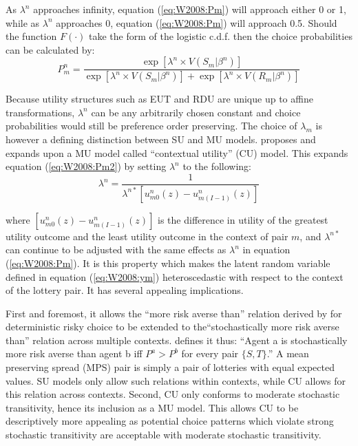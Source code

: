 \documentclass[../main.tex]{subfiles}
\begin{document}
As $\lambda^n$ approaches infinity, equation (\ref{eq:W2008:Pm}) will approach either 0 or 1, while as $\lambda^n$ approaches 0, equation (\ref{eq:W2008:Pm}) will approach 0.5.
Should the function $F(\cdot)$ take the form of the logistic c.d.f. then the choice probabilities can be calculated by:
\begin{equation}
	\label{eq:W2008:Pm2}
	P_m^n = \frac{\exp \left[ \lambda^n \times V(S_m | \beta^n) \right]}{  \exp \left[ \lambda^n \times V(S_m | \beta^n) \right] + \exp \left[ \lambda^n \times V(R_m | \beta^n) \right] }
\end{equation}

Because utility structures such as EUT and RDU are unique up to affine transformations, $\lambda^n$ can be any arbitrarily chosen constant and choice probabilities would still be preference order preserving.
The choice of $\lambda_m$ is however a defining distinction between SU and MU models.
\textcite{Wilcox2008} proposes and \textcite{Wilcox2011} expands upon a MU model called \enquote{contextual utility} (CU) model. This expands equation (\ref{eq:W2008:Pm2}) by setting $\lambda^n$ to the following:
\begin{equation}
	\lambda^n = \frac{1}{\lambda^{n*} \left[ u^n_{m0}(z) - u^n_{m(I-1)}(z) \right]}
\end{equation}

\noindent where $\left[ u^n_{m0}(z) - u^n_{m(I-1)}(z) \right]$ is the difference in utility of the greatest utility outcome and the least utility outcome in the context of pair $m$, and $\lambda^{n*}$ can continue to be adjusted with the same effects as $\lambda^n$ in equation (\ref{eq:W2008:Pm}).
It is this property which makes the latent random variable defined in equation (\ref{eq:W2008:ym}) heteroscedastic with respect to the context of the lottery pair.
It has several appealing implications.

First and foremost, it allows the \enquote{more risk averse than} relation derived by \textcite{Pratt1964} for deterministic risky choice to be extended to the\enquote{stochastically more risk averse than} relation across multiple contexts.
\textcite[89]{Wilcox2011} defines it thus: \enquote{Agent a is stochastically more risk averse than agent b \textelp{} iff $P^a > P^b$ for every  pair $\lbrace S, T \rbrace$.}
A mean preserving spread (MPS) pair is simply a pair of lotteries with equal expected values.
SU models only allow such relations within contexts, while CU allows for this relation across contexts.
Second, CU only conforms to moderate stochastic transitivity, hence its inclusion as a MU model.
This allows CU to be descriptively more appealing as potential choice patterns which violate strong stochastic transitivity are acceptable with moderate stochastic transitivity.
\end{document}
